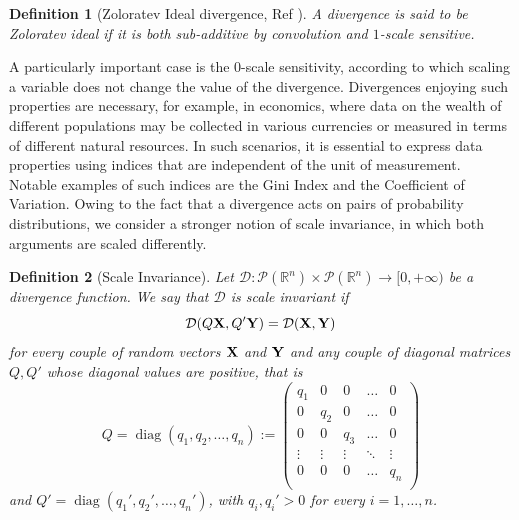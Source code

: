 \documentclass{article}
\renewcommand{\to}{\rightarrow}
\def\bX{{\bf X}}
\def\bY{{\bf Y}}
\DeclareMathOperator{\diag}{diag}
\def \PP{\mathcal{P}}
\def \erre{\mathbb{R}}
\newtheorem{definition}{Definition}
\begin{document}
\begin{definition}[Zoloratev Ideal divergence, Ref \cite{Zol}]
    A divergence is said to be Zoloratev ideal if it is both sub-additive by convolution and $1$-scale sensitive.
\end{definition}
% 

% 

% 
A particularly important case is the $0$-scale sensitivity, according to which scaling a variable does not change the value of the divergence.
% 
Divergences enjoying such properties are necessary, for example, in economics, where data on the wealth of different populations may be collected in various currencies or measured in terms of different natural resources.
% 
In such scenarios, it is essential to express data properties using indices that are independent of the unit of measurement.
% 
Notable examples of such indices are the Gini Index and the Coefficient of Variation.\cite{ABGT,AGT,VN} 
% 
Owing to the fact that a divergence acts on pairs of probability distributions, we consider a stronger notion of scale invariance, in which both arguments are scaled differently.
% 





\begin{definition}[Scale Invariance]
    \label{def:scaleinvariance}
    Let $ \mathcal{D}:\PP(\erre^n)\times\PP(\erre^n)\to[0,+\infty)$ be a divergence function. 
    We say that $ \mathcal{D}$ is scale invariant if 
    \begin{equation}
        \label{eq:scaleinvariance}
         \mathcal{D}(Q\bX,Q'\bY)= \mathcal{D}(\bX,\bY)
    \end{equation}
    for every couple of random vectors $\bX$ and $\bY$ and any couple of diagonal 
    matrices $Q,Q'$ whose diagonal values are positive, that is
    \[
        Q=  \diag(q_1,q_2,\dots,q_n):=\begin{pmatrix}
            q_1 & 0 & 0 & \dots & 0\\
            0 & q_2 & 0 & \dots & 0\\
            0 & 0 & q_3 & \dots & 0\\
            \vdots & \vdots & \vdots & \ddots & \vdots\\
            0 & 0 & 0 & \dots & q_n\\
        \end{pmatrix}
    \]
    and $Q'=\diag(q_1',q_2',\dots,q_n')$, with $q_i,q_i'>0$ for every $i=1,\dots,n$.
\end{definition}
\end{document}
